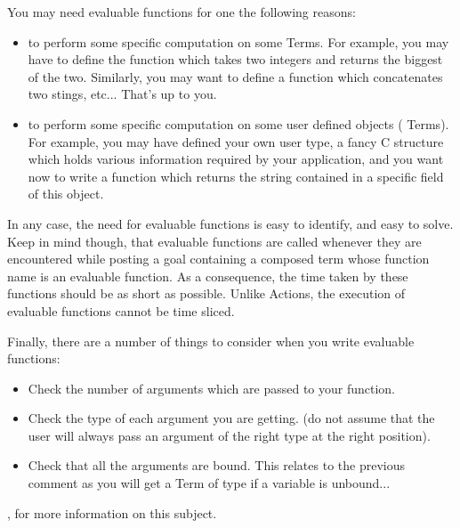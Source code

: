 You may need evaluable functions for one the following reasons:

\begin{itemize}

\item to perform some specific computation on some Terms. For example,
you may have to define the  function which takes two integers
and returns the biggest of the two. Similarly, you may want to define a
function which concatenates two stings, etc... That's up to you.

\item to perform some specific computation on some user defined objects
( Terms). For example, you may have defined your own user type, a
fancy C structure which holds various information required by your
application, and you want now to write a function which returns the string
contained in a specific field of this object.

\end{itemize}

In any case, the need for evaluable functions is easy to identify, and
easy to solve. Keep in mind though, that evaluable functions are called
whenever they are encountered while posting a goal containing a composed
term whose function name is an evaluable function. As a consequence, the
time taken by these functions should be as short as possible. Unlike
Actions, the execution of evaluable functions cannot be time sliced.

Finally, there are a number of things to consider when you write evaluable
functions:

\begin{itemize}

\item Check the number of arguments which are passed to your function.

\item Check the type of each argument you are getting. (do not assume
that the user will always pass an argument of the right type at the
right position).

\item Check that all the arguments are bound. This relates to the previous
comment as you will get a Term of type  if a variable is
unbound...

\end{itemize}

, for more information
on this subject.

